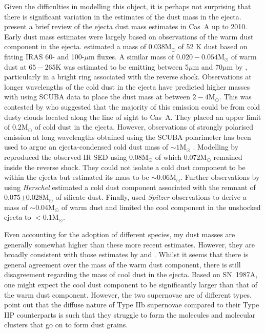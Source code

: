 Given the difficulties in modelling this object, it is perhaps not surprising that there is significant variation in the estimates of the dust mass in the ejecta.  \citet{Barlow2010} present a brief review of the ejecta dust mass estimates in Cas~A up to 2010.  Early dust mass estimates were largely based on observations of the warm dust component in the ejecta.  \citet{Arendt1999} estimated a mass of 0.038M$_{\odot}$ of 52 K dust based on fitting IRAS 60- and 100-$\mu$m fluxes.  A similar mass of $0.020-0.054$M$_{\odot}$ of warm dust at $65-265$K was estimated to be emitting between 5$\mu$m and 70$\mu$m by \citet{Rho2008}, particularly in a bright ring associated with the reverse shock.  Observations at longer wavelengths of the cold dust in the ejecta have predicted higher masses with \citet{Dunne2003} using SCUBA data to place the dust mass at between $2-4$M$_{\odot}$.  This was contested by \citet{Krause2004} who suggested that the majority of this emission could be from cold dusty clouds located along the line of sight to Cas~A.  They placed an upper limit of 0.2M$_{\odot}$ of cold dust in the ejecta.  However, observations of strongly polarised emission at long wavelengths obtained using the SCUBA polarimeter has been used to argue an ejecta-condensed cold dust mass of $\sim1$M$_{\odot}$ \citep{Dunne2009}.  Modelling by \citet{Nozawa2010}  reproduced the observed IR SED using 0.08M$_{\odot}$ of which 0.072M$_{\odot}$ remained inside the reverse shock.  They could not isolate a cold dust component to be within the ejecta but estimated its mass to be $\sim0.06$M$_{\odot}$.  Further observations by \citet{Barlow2010} using {\em Herschel} estimated a cold dust component associated with the remnant of 0.075$\pm$0.028M$_{\odot}$ of silicate dust.  Finally, \citet{Arendt2014} used {\em Spitzer} observations to derive a  mass of $\sim$0.04M$_{\odot}$ of warm dust and limited the cool component in the unshocked ejecta to $<0.1$M$_{\odot}$.

Even accounting for the adoption of different species, my dust masses are generally somewhat higher than these more recent estimates.  However, they are broadly consistent with those estimates by \citet{Dunne2003} and \citet{Dunne2009}.  Whilst it seems that there is general agreement over the mass of the warm dust component, there is still disagreement regarding the mass of cool dust in the ejecta.  Based on SN~1987A, one might expect the cool dust component to be significantly larger than that of the warm dust component.  However, the two supernovae are of different types. \citet{Biscaro2014} point out that the diffuse nature of Type IIb supernovae compared to their Type IIP counterparts is such that they struggle to form the molecules and molecular clusters that go on to form dust grains.   

